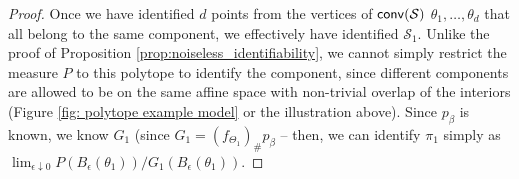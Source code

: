 \documentclass[bj,authoryear]{imsart}
\theoremstyle{plain}
\theoremstyle{remark}
\def\bbR{\mathbb{R}}
\def\cS{\mathcal{S}}
\def\conv{{\sf conv}}
\def\extr{{\sf extr }}
\def\norm#1{\left\|#1\right\|}
\begin{document}
\begin{appendix}
\begin{proof}
Once we have identified $d$ points from the vertices of $\conv(\cS)$ $\theta_1,\dots,\theta_d$ that all belong to the same component, we effectively have identified $\cS_1$. Unlike the proof of Proposition \ref{prop:noiseless_identifiability}, we cannot simply restrict the measure $P$ to this polytope to identify the component, since different components are allowed to be on the same affine space with non-trivial overlap of the interiors (Figure \ref{fig: polytope example model} or the illustration above). Since $p_\beta$ is known, we know $G_1$ (since $G_1=(f_{\Theta_1})_{\#} p_\beta$ -- then, we can identify $\pi_1$ simply as $\lim_{\epsilon\downarrow 0} P(B_{\epsilon}(\theta_1))/G_1(B_\epsilon(\theta_1))$. 


\end{proof}
\end{appendix}
\end{document}
